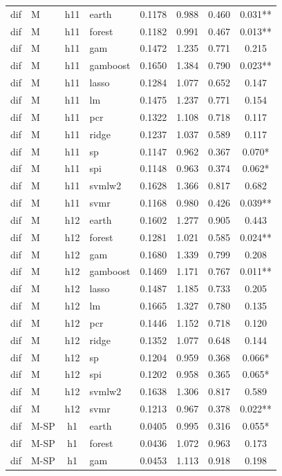 \begin{ThreePartTable}
\begin{longtable}[t]{llclcccc}
\addlinespace
dif & M & h11 & earth & 0.1178 & 0.988 & 0.460 & 0.031**\\
dif & M & h11 & forest & 0.1182 & 0.991 & 0.467 & 0.013**\\
dif & M & h11 & gam & 0.1472 & 1.235 & 0.771 & 0.215\\
dif & M & h11 & gamboost & 0.1650 & 1.384 & 0.790 & 0.023**\\
dif & M & h11 & lasso & 0.1284 & 1.077 & 0.652 & 0.147\\
dif & M & h11 & lm & 0.1475 & 1.237 & 0.771 & 0.154\\
dif & M & h11 & pcr & 0.1322 & 1.108 & 0.718 & 0.117\\
dif & M & h11 & ridge & 0.1237 & 1.037 & 0.589 & 0.117\\
dif & M & h11 & sp & 0.1147 & 0.962 & 0.367 & 0.070*\\
dif & M & h11 & spi & 0.1148 & 0.963 & 0.374 & 0.062*\\
dif & M & h11 & svmlw2 & 0.1628 & 1.366 & 0.817 & 0.682\\
dif & M & h11 & svmr & 0.1168 & 0.980 & 0.426 & 0.039**\\
\addlinespace
dif & M & h12 & earth & 0.1602 & 1.277 & 0.905 & 0.443\\
dif & M & h12 & forest & 0.1281 & 1.021 & 0.585 & 0.024**\\
dif & M & h12 & gam & 0.1680 & 1.339 & 0.799 & 0.208\\
dif & M & h12 & gamboost & 0.1469 & 1.171 & 0.767 & 0.011**\\
dif & M & h12 & lasso & 0.1487 & 1.185 & 0.733 & 0.205\\
dif & M & h12 & lm & 0.1665 & 1.327 & 0.780 & 0.135\\
dif & M & h12 & pcr & 0.1446 & 1.152 & 0.718 & 0.120\\
dif & M & h12 & ridge & 0.1352 & 1.077 & 0.648 & 0.144\\
dif & M & h12 & sp & 0.1204 & 0.959 & 0.368 & 0.066*\\
dif & M & h12 & spi & 0.1202 & 0.958 & 0.365 & 0.065*\\
dif & M & h12 & svmlw2 & 0.1638 & 1.306 & 0.817 & 0.589\\
dif & M & h12 & svmr & 0.1213 & 0.967 & 0.378 & 0.022**\\
\addlinespace
dif & M-SP & h1 & earth & 0.0405 & 0.995 & 0.316 & 0.055*\\
dif & M-SP & h1 & forest & 0.0436 & 1.072 & 0.963 & 0.173\\
dif & M-SP & h1 & gam & 0.0453 & 1.113 & 0.918 & 0.198\\

\end{longtable}
\end{ThreePartTable}
